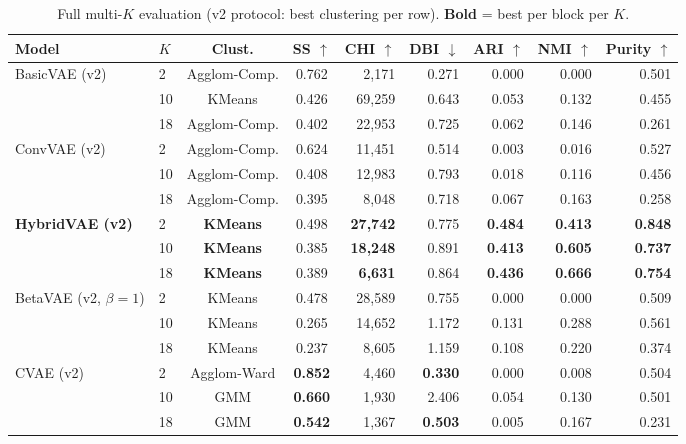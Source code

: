 \documentclass{article}
\begin{document}
\begin{table}[H]
\centering
\caption{Full multi-$K$ evaluation (v2 protocol: best clustering per row).
\textbf{Bold} = best per block per $K$.}
\label{tab:multi_k}
\small
\begin{tabular}{llccrrrrr}
\toprule
\textbf{Model} & \textbf{$K$} & \textbf{Clust.} & \textbf{SS $\uparrow$} &
\textbf{CHI $\uparrow$} & \textbf{DBI $\downarrow$} & \textbf{ARI $\uparrow$} &
\textbf{NMI $\uparrow$} & \textbf{Purity $\uparrow$} \\
\midrule
\multirow{3}{*}{BasicVAE (v2)}
 & 2  & Agglom-Comp. & 0.762 &  2,171 & 0.271 & 0.000 & 0.000 & 0.501 \\
 & 10 & KMeans       & 0.426 & 69,259 & 0.643 & 0.053 & 0.132 & 0.455 \\
 & 18 & Agglom-Comp. & 0.402 & 22,953 & 0.725 & 0.062 & 0.146 & 0.261 \\
\midrule
\multirow{3}{*}{ConvVAE (v2)}
 & 2  & Agglom-Comp. & 0.624 & 11,451 & 0.514 & 0.003 & 0.016 & 0.527 \\
 & 10 & Agglom-Comp. & 0.408 & 12,983 & 0.793 & 0.018 & 0.116 & 0.456 \\
 & 18 & Agglom-Comp. & 0.395 &  8,048 & 0.718 & 0.067 & 0.163 & 0.258 \\
\midrule
\multirow{3}{*}{\textbf{HybridVAE (v2)}}
 & 2  & \textbf{KMeans} & 0.498 & \textbf{27,742} & 0.775 &
              \textbf{0.484} & \textbf{0.413} & \textbf{0.848} \\
 & 10 & \textbf{KMeans} & 0.385 & \textbf{18,248} & 0.891 &
              \textbf{0.413} & \textbf{0.605} & \textbf{0.737} \\
 & 18 & \textbf{KMeans} & 0.389 & \textbf{6,631} & 0.864 &
              \textbf{0.436} & \textbf{0.666} & \textbf{0.754} \\
\midrule
\multirow{3}{*}{BetaVAE (v2, $\beta\!=\!1$)}
 & 2  & KMeans & 0.478 & 28,589 & 0.755 & 0.000 & 0.000 & 0.509 \\
 & 10 & KMeans & 0.265 & 14,652 & 1.172 & 0.131 & 0.288 & 0.561 \\
 & 18 & KMeans & 0.237 &  8,605 & 1.159 & 0.108 & 0.220 & 0.374 \\
\midrule
\multirow{3}{*}{CVAE (v2)}
 & 2  & Agglom-Ward & \textbf{0.852} & 4,460 & \textbf{0.330} & 0.000 & 0.008 & 0.504 \\
 & 10 & GMM         & \textbf{0.660} & 1,930 & 2.406 & 0.054 & 0.130 & 0.501 \\
 & 18 & GMM         & \textbf{0.542} & 1,367 & \textbf{0.503} & 0.005 & 0.167 & 0.231 \\

\end{tabular}
\end{table}
\end{document}
